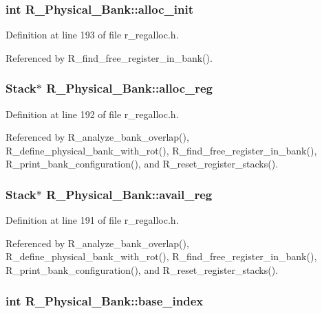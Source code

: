 \subsubsection{\setlength{\rightskip}{0pt plus 5cm}int \bf{R\_\-Physical\_\-Bank::alloc\_\-init}}\label{structR__Physical__Bank_692459b96a5dbf06f6ac88a7f48409e1}




Definition at line 193 of file r\_\-regalloc.h.

Referenced by R\_\-find\_\-free\_\-register\_\-in\_\-bank().
\subsubsection{\setlength{\rightskip}{0pt plus 5cm}\bf{Stack}$\ast$ \bf{R\_\-Physical\_\-Bank::alloc\_\-reg}}\label{structR__Physical__Bank_35141d58063181682deec382d1cd2c5b}




Definition at line 192 of file r\_\-regalloc.h.

Referenced by R\_\-analyze\_\-bank\_\-overlap(), R\_\-define\_\-physical\_\-bank\_\-with\_\-rot(), R\_\-find\_\-free\_\-register\_\-in\_\-bank(), R\_\-print\_\-bank\_\-configuration(), and R\_\-reset\_\-register\_\-stacks().
\subsubsection{\setlength{\rightskip}{0pt plus 5cm}\bf{Stack}$\ast$ \bf{R\_\-Physical\_\-Bank::avail\_\-reg}}\label{structR__Physical__Bank_26ddb208e52399c34b1e0c0571e1b7da}




Definition at line 191 of file r\_\-regalloc.h.

Referenced by R\_\-analyze\_\-bank\_\-overlap(), R\_\-define\_\-physical\_\-bank\_\-with\_\-rot(), R\_\-find\_\-free\_\-register\_\-in\_\-bank(), R\_\-print\_\-bank\_\-configuration(), and R\_\-reset\_\-register\_\-stacks().
\subsubsection{\setlength{\rightskip}{0pt plus 5cm}int \bf{R\_\-Physical\_\-Bank::base\_\-index}}\label{structR__Physical__Bank_8c9c809af492184af5f849ada9c3b219}




